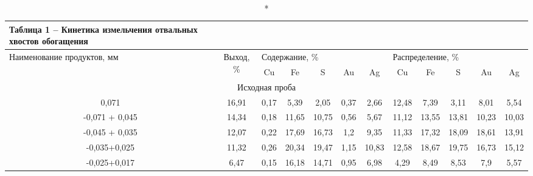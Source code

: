 {\small
\begin{longtable}[c]{|p{}ccccccccccc|}
\caption*{Таблица 1 -- Кинетика измельчения отвальных хвостов обогащения} \\
\hline
\multicolumn{1}{|p{0.15\textwidth}|}{\multirow{2}{=}{Наименование продуктов, мм}} & \multicolumn{1}{p{0.06\textwidth}|}{\multirow{2}{=}{Выход, \%}} & \multicolumn{5}{l|}{Содержание, \%} & \multicolumn{5}{l|}{Распределение, \%} \\ \cline{3-12} 
\multicolumn{1}{|c|}{} & \multicolumn{1}{c|}{} & \multicolumn{1}{c|}{Cu} & \multicolumn{1}{c|}{Fe} & \multicolumn{1}{c|}{S} & \multicolumn{1}{c|}{Au} & \multicolumn{1}{c|}{Ag} & \multicolumn{1}{c|}{Cu} & \multicolumn{1}{c|}{Fe} & \multicolumn{1}{c|}{S} & \multicolumn{1}{c|}{Au} & Ag \\ \hline
\endfirsthead
%
\endhead
%
\multicolumn{12}{|c|}{Исходная проба} \\ \hline
\multicolumn{1}{|c|}{0,071} & \multicolumn{1}{c|}{16,91} & \multicolumn{1}{c|}{0,17} & \multicolumn{1}{c|}{5,39} & \multicolumn{1}{c|}{2,05} & \multicolumn{1}{c|}{0,37} & \multicolumn{1}{c|}{2,66} & \multicolumn{1}{c|}{12,48} & \multicolumn{1}{c|}{7,39} & \multicolumn{1}{c|}{3,11} & \multicolumn{1}{c|}{8,01} & 5,54 \\ \hline
\multicolumn{1}{|c|}{-0,071 + 0,045} & \multicolumn{1}{c|}{14,34} & \multicolumn{1}{c|}{0,18} & \multicolumn{1}{c|}{11,65} & \multicolumn{1}{c|}{10,75} & \multicolumn{1}{c|}{0,56} & \multicolumn{1}{c|}{5,67} & \multicolumn{1}{c|}{11,12} & \multicolumn{1}{c|}{13,55} & \multicolumn{1}{c|}{13,81} & \multicolumn{1}{c|}{10,23} & 10,03 \\ \hline
\multicolumn{1}{|c|}{-0,045 + 0,035} & \multicolumn{1}{c|}{12,07} & \multicolumn{1}{c|}{0,22} & \multicolumn{1}{c|}{17,69} & \multicolumn{1}{c|}{16,73} & \multicolumn{1}{c|}{1,2} & \multicolumn{1}{c|}{9,35} & \multicolumn{1}{c|}{11,33} & \multicolumn{1}{c|}{17,32} & \multicolumn{1}{c|}{18,09} & \multicolumn{1}{c|}{18,61} & 13,91 \\ \hline
\multicolumn{1}{|c|}{-0,035+0,025} & \multicolumn{1}{c|}{11,32} & \multicolumn{1}{c|}{0,26} & \multicolumn{1}{c|}{20,34} & \multicolumn{1}{c|}{19,47} & \multicolumn{1}{c|}{1,15} & \multicolumn{1}{c|}{10,83} & \multicolumn{1}{c|}{12,58} & \multicolumn{1}{c|}{18,67} & \multicolumn{1}{c|}{19,75} & \multicolumn{1}{c|}{16,73} & 15,12 \\ \hline
\multicolumn{1}{|c|}{-0,025+0,017} & \multicolumn{1}{c|}{6,47} & \multicolumn{1}{c|}{0,15} & \multicolumn{1}{c|}{16,18} & \multicolumn{1}{c|}{14,71} & \multicolumn{1}{c|}{0,95} & \multicolumn{1}{c|}{6,98} & \multicolumn{1}{c|}{4,29} & \multicolumn{1}{c|}{8,49} & \multicolumn{1}{c|}{8,53} & \multicolumn{1}{c|}{7,9} & 5,57 \\ \hline

\end{longtable}}
